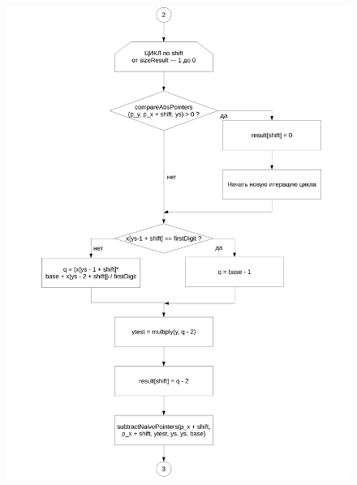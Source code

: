 \documentclass[a4paper,12pt]{article} %
\begin{document}
\begin{figure}[ht]
	\includegraphics[width=\textwidth]{lr3_divide-2.pdf}
\end{figure}
\end{document}

